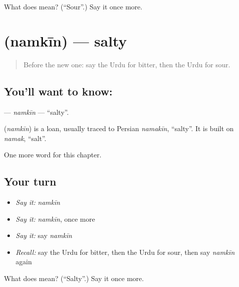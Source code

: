 \begin{tcolorbox}[breakable,colback=teal!4,colframe=teal!35!black,title={Before you move on}]
What does  mean? (\textquotedblleft{}Sour\textquotedblright{}.) Say it once more.
\end{tcolorbox}
\section[\texorpdfstring{\ur{نمکین} (namkīn)}{نمکین (namkīn)}]{ (namkīn) — salty}

\label{lesson:UR-C131-namkin}



\begin{quote}
Before the new one: say the Urdu for bitter, then the Urdu for sour.
\end{quote}

\subsection*{You'll want to know: }
\textbf{} — \emph{namkīn} — \textquotedblleft{}salty\textquotedblright{}.

\begin{cousinweb}
\textbf{} (\emph{namkīn}) is a loan, usually traced to Persian \emph{namakīn}, \textquotedblleft{}salty\textquotedblright{}. It is built on \emph{namak}, \textquotedblleft{}salt\textquotedblright{}.
\end{cousinweb}

\begin{grammarlens}[title={What you've built}]
One more word for this chapter.
\end{grammarlens}

\subsection*{Your turn}
\begin{itemize}
\raggedright
  \item \emph{Say it:} \emph{namkīn}
  \item \emph{Say it:} \emph{namkīn}, once more
  \item \emph{Say it:} say \emph{namkīn}
  \item \emph{Recall:} say the Urdu for bitter, then the Urdu for sour, then say \emph{namkīn} again
\end{itemize}

\begin{tcolorbox}[breakable,colback=teal!4,colframe=teal!35!black,title={Before you move on}]
What does  mean? (\textquotedblleft{}Salty\textquotedblright{}.) Say it once more.
\end{tcolorbox}
